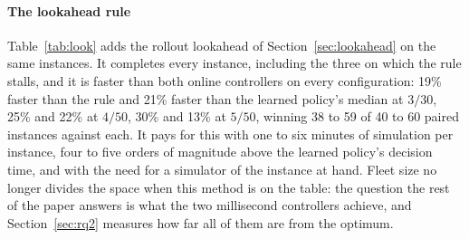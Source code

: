 \documentclass[final,5p,times,twocolumn]{elsarticle}
\begin{document}
\paragraph{The lookahead rule}
Table~\ref{tab:look} adds the rollout lookahead of Section~\ref{sec:lookahead} on the same
instances. It completes every instance, including the three on which the rule stalls, and it is
faster than both online controllers on every configuration: 19\% faster than the rule and 21\%
faster than the learned policy's median at $3/30$, 25\% and 22\% at $4/50$, 30\% and 13\% at
$5/50$, winning 38 to 59 of 40 to 60 paired instances against each. It pays for this with one to
six minutes of simulation per instance, four to five orders of magnitude above the learned policy's
decision time, and with the need for a simulator of the instance at hand. Fleet size no longer
divides the space when this method is on the table: the question the rest of the paper answers is
what the two millisecond controllers achieve, and Section~\ref{sec:rq2} measures how far all of
them are from the optimum.

\begin{table}[t]
\centering
\caption{Mean makespan of the rule, the lookahead rule and the learned policy (per-instance
median of its paired runs) on the three main configurations in the continuous space, with the
number of completed instances or runs, wins--losses and Wilcoxon $p$ of the lookahead rule against
each, on instances all three complete, and its mean simulation time per instance.}
\label{tab:look}
\scriptsize
\setlength{\tabcolsep}{0.9pt}

\end{table}
\end{document}
